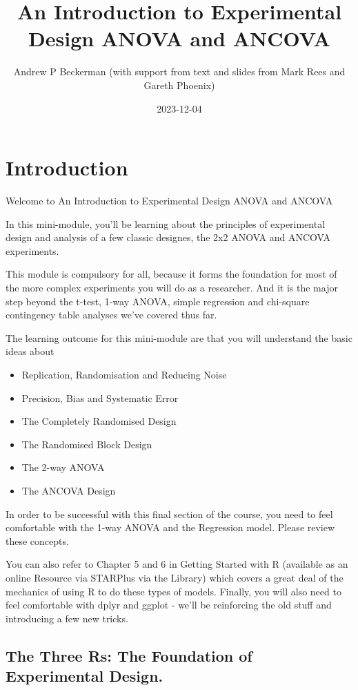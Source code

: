 \documentclass[
]{book}
\title{An Introduction to Experimental Design ANOVA and ANCOVA}
\author{Andrew P Beckerman (with support from text and slides from Mark Rees and Gareth Phoenix)}
\date{2023-12-04}
\providecommand{\tightlist}{%
  \setlength{\itemsep}{0pt}\setlength{\parskip}{0pt}}
\begin{document}
\maketitle

{
\setcounter{tocdepth}{1}
\tableofcontents
}
\hypertarget{introduction}{%
\chapter{Introduction}\label{introduction}}

Welcome to An Introduction to Experimental Design ANOVA and ANCOVA

In this mini-module, you'll be learning about the principles of experimental design and analysis of a few classic designes, the 2x2 ANOVA and ANCOVA experiments.

This module is compulsory for all, because it forms the foundation for most of the more complex experiments you will do as a researcher. And it is the major step beyond the t-test, 1-way ANOVA, simple regression and chi-square contingency table analyses we've covered thus far.

The learning outcome for this mini-module are that you will understand the basic ideas about

\begin{itemize}
\tightlist
\item
  Replication, Randomisation and Reducing Noise
\item
  Precision, Bias and Systematic Error
\item
  The Completely Randomised Design
\item
  The Randomised Block Design
\item
  The 2-way ANOVA
\item
  The ANCOVA Design
\end{itemize}

In order to be successful with this final section of the course, you need to feel comfortable with the 1-way ANOVA and the Regression model. Please review these concepts.

You can also refer to Chapter 5 and 6 in Getting Started with R (available as an online Resource via STARPlus via the Library) which covers a great deal of the mechanics of using R to do these types of models. Finally, you will also need to feel comfortable with dplyr and ggplot - we'll be reinforcing the old stuff and introducing a few new tricks.

\hypertarget{the-three-rs-the-foundation-of-experimental-design.}{%
\section{The Three Rs: The Foundation of Experimental Design.}\label{the-three-rs-the-foundation-of-experimental-design.}}
\end{document}
